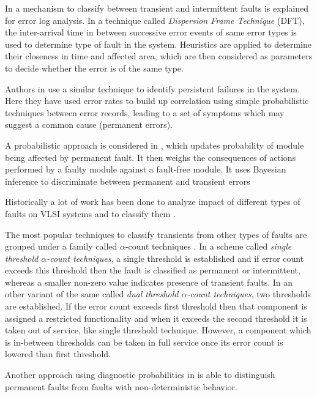 In \cite{Lin1990} a mechanism to classify between transient and intermittent faults is explained for error log analysis. In a technique called \emph{Dispersion Frame Technique} (DFT), the inter-arrival time in between successive error events of same error types is used to determine type of fault in the system. Heuristics are applied to determine their closeness in time and affected area, which are then considered as parameters to decide whether the error is of the same type.

Authors in \cite{Iyer1990} use a similar technique to identify persistent failures in the system. Here they have used error rates to build up correlation using simple probabilistic techniques between error records, leading to a set of symptoms which may suggest a common cause (permanent errors).

A probabilistic approach is considered in \cite{Pizza1998}, which updates probability of module being affected by permanent fault. It then weighs the consequences of actions performed by a faulty module against a fault-free module. It uses Bayesian inference to discriminate between permanent and transient errors

Historically a lot of work has been done to analyze impact of different types of faults on VLSI systems \cite{Constantinescu2003,Constantinescu2007,Dodd2003} and to classify them \cite{Savir1980, Espinosa2013, Bondavalli2000, DeKleer2009}.

The most popular techniques to classify transients from other types of faults are grouped under a family called $\alpha$-count techniques \cite{Bondavalli2000}. In a scheme called \emph{single threshold $\alpha$-count techniques}, a single threshold is established and if error count exceeds this threshold then the fault is classified as permanent or intermittent, whereas a smaller non-zero value indicates presence of transient faults. In an other variant of the same called \emph{dual threshold $\alpha$-count techniques}, two thresholds are established. If the error count exceeds first threshold then that component is assigned a restricted functionality and when it exceeds the second threshold it is taken out of service, like single threshold technique. However, a component which is in-between thresholds can be taken in full service once its error count is lowered than first threshold.

Another approach using diagnostic probabilities in \cite{DeKleer2009} is able to distinguish permanent faults from faults with non-deterministic behavior.

